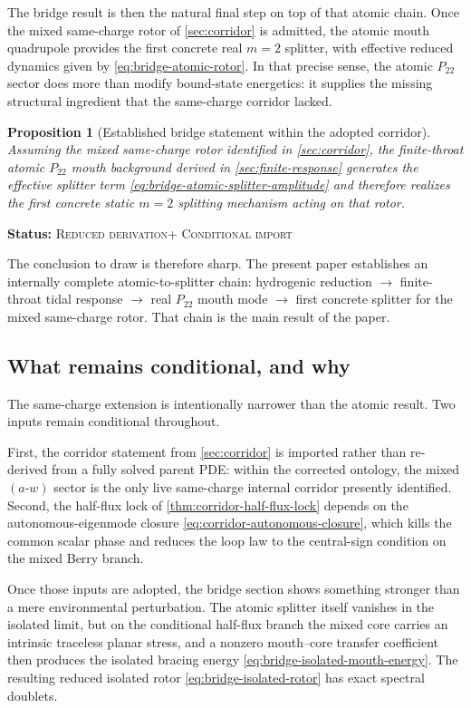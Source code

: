 \documentclass[11pt]{article}
\theoremstyle{plain}
\newtheorem{proposition}[theorem]{Proposition}
\theoremstyle{definition}
\theoremstyle{remark}
\newcommand{\statusReduced}{\textsc{Reduced derivation}}
\newcommand{\statusConditional}{\textsc{Conditional import}}
\newcommand{\claimstatus}[1]{\par\smallskip\noindent\textbf{Status:} #1\par\smallskip}
\newcommand{\Ptwotwo}{P_{22}}
\begin{document}
The bridge result is then the natural final step on top of that atomic chain. Once the mixed same-charge rotor of \cref{sec:corridor} is admitted, the atomic mouth quadrupole provides the first concrete real \(m=2\) splitter, with effective reduced dynamics given by \cref{eq:bridge-atomic-rotor}. In that precise sense, the atomic \(\Ptwotwo\) sector does more than modify bound-state energetics: it supplies the missing structural ingredient that the same-charge corridor lacked.

\begin{proposition}[Established bridge statement within the adopted corridor]\label{prop:discussion-bridge-established}
Assuming the mixed same-charge rotor identified in \cref{sec:corridor}, the finite-throat atomic \(\Ptwotwo\) mouth background derived in \cref{sec:finite-response} generates the effective splitter term \cref{eq:bridge-atomic-splitter-amplitude} and therefore realizes the first concrete static \(m=2\) splitting mechanism acting on that rotor.
\end{proposition}
\claimstatus{\statusReduced + \statusConditional}

The conclusion to draw is therefore sharp. The present paper establishes an internally complete atomic-to-splitter chain: hydrogenic reduction $\to$ finite-throat tidal response $\to$ real \(\Ptwotwo\) mouth mode $\to$ first concrete splitter for the mixed same-charge rotor. That chain is the main result of the paper.

\subsection{What remains conditional, and why}\label{subsec:discussion-conditional}

The same-charge extension is intentionally narrower than the atomic result. Two inputs remain conditional throughout.

First, the corridor statement from \cref{sec:corridor} is imported rather than re-derived from a fully solved parent PDE: within the corrected ontology, the mixed \((a\text{-}w)\) sector is the only live same-charge internal corridor presently identified. Second, the half-flux lock of \cref{thm:corridor-half-flux-lock} depends on the autonomous-eigenmode closure \cref{eq:corridor-autonomous-closure}, which kills the common scalar phase and reduces the loop law to the central-sign condition on the mixed Berry branch.

Once those inputs are adopted, the bridge section shows something stronger than a mere environmental perturbation. The atomic splitter itself vanishes in the isolated limit, but on the conditional half-flux branch the mixed core carries an intrinsic traceless planar stress, and a nonzero mouth--core transfer coefficient then produces the isolated bracing energy \cref{eq:bridge-isolated-mouth-energy}. The resulting reduced isolated rotor \cref{eq:bridge-isolated-rotor} has exact spectral doublets.
\end{document}
